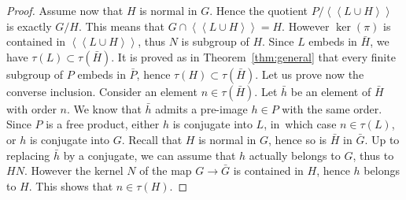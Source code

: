 \documentclass[11pt]{article}
\theoremstyle{definition}
\newcommand{\normal}[1]{\left<\! \left< #1\right> \!\right>}
\begin{document}
\begin{proof}
Assume now that $H$ is normal in $G$.
Hence the quotient $P / \normal{ L \cup H}$ is exactly $G/H$.
This means that $G \cap \normal{L \cup H} = H$.
However $\ker(\pi)$ is contained in $\normal{L \cup H}$, thus $N$ is subgroup of $H$.
Since $L$ embeds in $\bar H$, we have $\tau(L) \subset \tau(\bar H)$.
It is proved as in Theorem~\ref{thm:general} that every finite subgroup of $P$ embeds in $\bar{P}$, hence $\tau(H) \subset \tau(\bar H)$.
Let us prove now the converse inclusion.
Consider an element $n \in \tau(\bar H)$.
Let $\bar h$ be an element of $\bar H$ with order $n$.
We know that $\bar h$ admits a pre-image $h \in P$ with the same order.
Since $P$ is a free product, either $h$ is conjugate into $L$, in~which case $n \in \tau(L)$, or $h$ is conjugate into $G$.
Recall that $H$ is normal in $G$, hence so is $\bar H$ in $\bar G$.
Up to replacing $\bar h$ by a conjugate, we can assume that $h$ actually belongs to $G$, thus to $HN$.
However the kernel $N$ of the map $G\to \bar G$ is contained in $H$, hence $h$ belongs to $H$.
This shows that $n \in \tau(H)$.
\end{proof}
\end{document}
